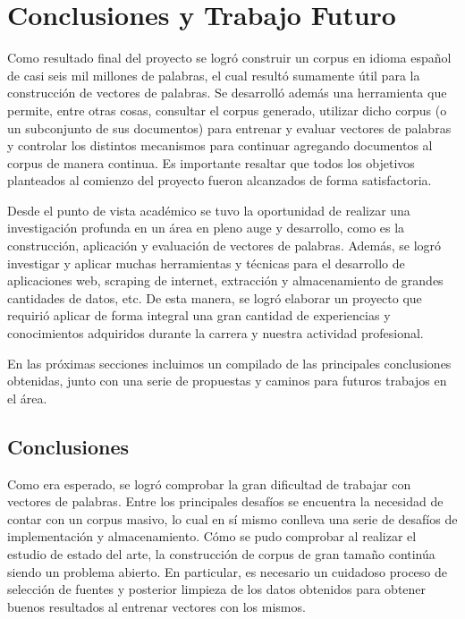 \chapter{Conclusiones y Trabajo Futuro}

Como resultado final del proyecto se logró construir un corpus en idioma español de casi seis mil
millones de palabras, el cual resultó sumamente útil para la construcción de vectores de palabras.
Se desarrolló además una herramienta que permite, entre otras cosas, consultar el corpus generado,
utilizar dicho corpus (o un subconjunto de sus documentos) para entrenar y evaluar vectores de
palabras y controlar los distintos mecanismos para continuar agregando documentos al corpus de
manera continua. Es importante resaltar que todos los objetivos planteados al comienzo del proyecto
fueron alcanzados de forma satisfactoria.

Desde el punto de vista académico se tuvo la oportunidad de realizar una investigación profunda en
un área en pleno auge y desarrollo, como es la construcción, aplicación y evaluación de vectores
de palabras. Además, se logró investigar y aplicar muchas herramientas y técnicas para el
desarrollo de aplicaciones web, scraping de internet, extracción y almacenamiento de grandes
cantidades de datos, etc. De esta manera, se logró elaborar un proyecto que requirió aplicar de
forma integral una gran cantidad de experiencias y conocimientos adquiridos durante la carrera y
nuestra actividad profesional.

En las próximas secciones incluimos un compilado de las principales conclusiones obtenidas, junto
con una serie de propuestas y caminos para futuros trabajos en el área.

\section{Conclusiones}

Como era esperado, se logró comprobar la gran dificultad de trabajar con vectores de palabras. Entre
los principales desafíos se encuentra la necesidad de contar con un corpus masivo, lo cual en sí mismo
conlleva una serie de desafíos de implementación y almacenamiento. Cómo se pudo comprobar al
realizar el estudio de estado del arte, la construcción de corpus de gran tamaño continúa siendo un
problema abierto. En particular, es necesario un cuidadoso proceso de selección de fuentes y posterior
limpieza de los datos obtenidos para obtener buenos resultados al entrenar vectores con los mismos.

